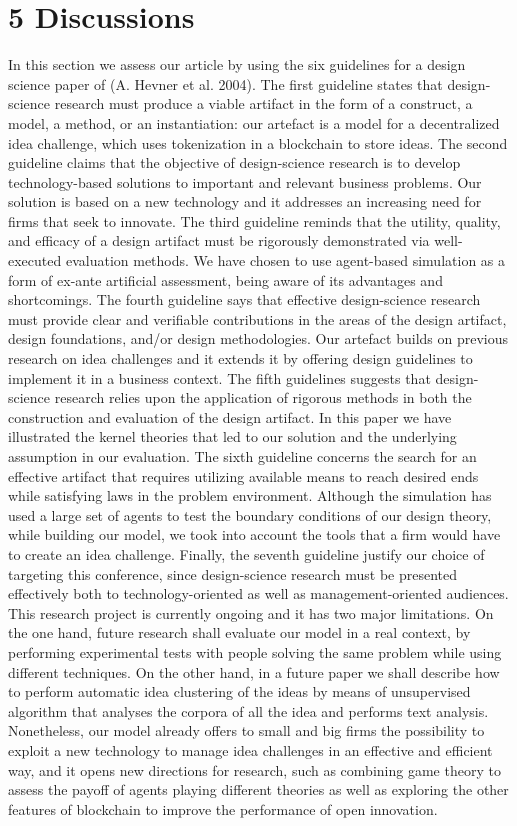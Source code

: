 \documentclass[]{elsarticle} %
\begin{document}
\section{5 Discussions}\label{discussions}

In this section we assess our article by using the six guidelines for a
design science paper of (A. Hevner et al. 2004). The first guideline
states that design-science research must produce a viable artifact in
the form of a construct, a model, a method, or an instantiation: our
artefact is a model for a decentralized idea challenge, which uses
tokenization in a blockchain to store ideas. The second guideline claims
that the objective of design-science research is to develop
technology-based solutions to important and relevant business problems.
Our solution is based on a new technology and it addresses an increasing
need for firms that seek to innovate. The third guideline reminds that
the utility, quality, and efficacy of a design artifact must be
rigorously demonstrated via well-executed evaluation methods. We have
chosen to use agent-based simulation as a form of ex-ante artificial
assessment, being aware of its advantages and shortcomings. The fourth
guideline says that effective design-science research must provide clear
and verifiable contributions in the areas of the design artifact, design
foundations, and/or design methodologies. Our artefact builds on
previous research on idea challenges and it extends it by offering
design guidelines to implement it in a business context. The fifth
guidelines suggests that design-science research relies upon the
application of rigorous methods in both the construction and evaluation
of the design artifact. In this paper we have illustrated the kernel
theories that led to our solution and the underlying assumption in our
evaluation. The sixth guideline concerns the search for an effective
artifact that requires utilizing available means to reach desired ends
while satisfying laws in the problem environment. Although the
simulation has used a large set of agents to test the boundary
conditions of our design theory, while building our model, we took into
account the tools that a firm would have to create an idea challenge.
Finally, the seventh guideline justify our choice of targeting this
conference, since design-science research must be presented effectively
both to technology-oriented as well as management-oriented audiences.
This research project is currently ongoing and it has two major
limitations. On the one hand, future research shall evaluate our model
in a real context, by performing experimental tests with people solving
the same problem while using different techniques. On the other hand, in
a future paper we shall describe how to perform automatic idea
clustering of the ideas by means of unsupervised algorithm that analyses
the corpora of all the idea and performs text analysis. Nonetheless, our
model already offers to small and big firms the possibility to exploit a
new technology to manage idea challenges in an effective and efficient
way, and it opens new directions for research, such as combining game
theory to assess the payoff of agents playing different theories as well
as exploring the other features of blockchain to improve the performance
of open innovation.
\end{document}
